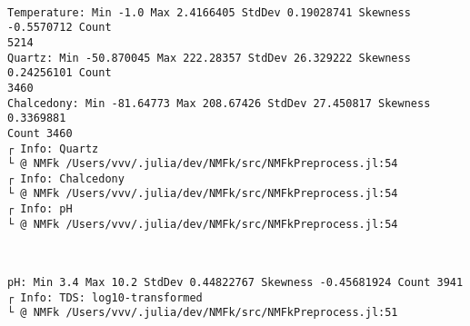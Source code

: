 \documentclass[11pt]{article}
\begin{document}
    \begin{center}
    \end{center}
    { \hspace*{\fill} \\}
    
    \begin{Verbatim}[commandchars=\\\{\}]
Temperature: Min -1.0 Max 2.4166405 StdDev 0.19028741 Skewness -0.5570712 Count
5214
Quartz: Min -50.870045 Max 222.28357 StdDev 26.329222 Skewness 0.24256101 Count
3460
Chalcedony: Min -81.64773 Max 208.67426 StdDev 27.450817 Skewness 0.3369881
Count 3460
┌ Info: Quartz
└ @ NMFk /Users/vvv/.julia/dev/NMFk/src/NMFkPreprocess.jl:54
┌ Info: Chalcedony
└ @ NMFk /Users/vvv/.julia/dev/NMFk/src/NMFkPreprocess.jl:54
┌ Info: pH
└ @ NMFk /Users/vvv/.julia/dev/NMFk/src/NMFkPreprocess.jl:54
    \end{Verbatim}

    \begin{center}
    \end{center}
    { \hspace*{\fill} \\}
    
    \begin{Verbatim}[commandchars=\\\{\}]
pH: Min 3.4 Max 10.2 StdDev 0.44822767 Skewness -0.45681924 Count 3941
┌ Info: TDS: log10-transformed
└ @ NMFk /Users/vvv/.julia/dev/NMFk/src/NMFkPreprocess.jl:51
    \end{Verbatim}

    \begin{center}
    \end{center}
    { \hspace*{\fill} \\}
    
    \begin{center}
    \end{center}
    { \hspace*{\fill} \\}
    
\end{document}

